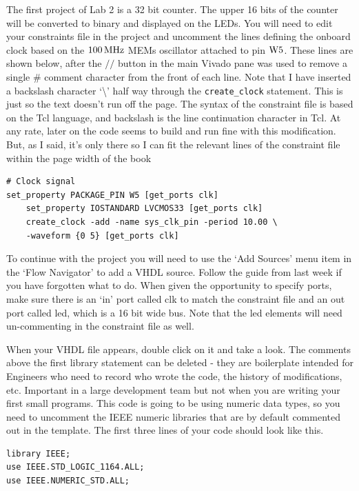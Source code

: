 \documentclass[../physical_computing.tex]{subfiles}
\begin{document}
The first project of Lab 2 is a 32 bit counter. The upper 16 bits of the counter will be converted to binary and displayed on the LEDs. You will need to edit your constraints file in the project and uncomment the lines defining the onboard clock based on the $\rm 100\,MHz$ MEMs oscillator attached to pin $\rm W5$. These lines are shown below, after the $//$ button in the main Vivado pane was used to remove a single \# comment character from the front of each line. Note that I have inserted a backslash character `\textbackslash' half way through the \texttt{create\_clock} statement. This is just so the text doesn't run off the page. The syntax of the constraint file is based on the Tcl language, and backslash is the line continuation character in Tcl. At any rate, later on the code seems to build and run fine with this modification. But, as I said, it's only there so I can fit the relevant lines of the constraint file within the page width of the book

\begin{verbatim}
# Clock signal
set_property PACKAGE_PIN W5 [get_ports clk]
	set_property IOSTANDARD LVCMOS33 [get_ports clk]
	create_clock -add -name sys_clk_pin -period 10.00 \
	-waveform {0 5} [get_ports clk]
\end{verbatim}

To continue with the project you will need to use the `Add Sources' menu item in the `Flow Navigator' to add a VHDL source. Follow the guide from last week if you have forgotten what to do. When given the opportunity to specify ports, make sure there is an `in' port called clk to match the constraint file and an out port called led, which is a 16 bit wide bus. Note that the led elements will need un-commenting in the constraint file as well.

When your VHDL file appears, double click on it and take a look. The comments above the first library statement can be deleted - they are boilerplate intended for Engineers who need to record who wrote the code, the history of modifications, etc. Important in a large development team but not when you are writing your first small programs. This code is going to be using numeric data types, so you need to uncomment the IEEE numeric libraries that are by default commented out in the template. The first three lines of your code should look like this.

\begin{verbatim}
library IEEE;
use IEEE.STD_LOGIC_1164.ALL;
use IEEE.NUMERIC_STD.ALL;
\end{verbatim}
\end{document}
